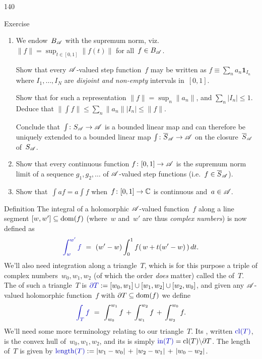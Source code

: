 \begin{parsec}{140}
\begin{point}{20}{Exercise}
\begin{enumerate}
\item
We endow~$B_{\mathscr{A}}$
with the supremum norm,
viz.~$\|f\|=\sup_{t\in[0,1]} \|f(t)\|$
for all~$f\in B_{\mathscr{A}}$.

Show that every $\mathscr{A}$-valued step function~$f$
may be written as
$f\equiv \sum_n a_n \mathbf{1}_{I_n}$
where $I_1,\dotsc,I_N$
are \emph{disjoint and non-empty}
intervals in~$[0,1]$.

Show that 
for such a representation
$\|f\|=\sup_n \|a_n\|$, and
$\sum_n \left|I_n\right|\leq 1$.
Deduce that
$\|\int f\| \leq \sum_n \|a_n\|\left|I_n\right|
\leq \|f\|$.

Conclude that~$\int\colon S_{\mathscr{A}}\to\mathscr{A}$
is a bounded linear map
and can therefore
be uniquely extended to a bounded linear map
$\int\colon \overline{S}_{\mathscr{A}}\to\mathscr{A}$
on the closure~$\overline{S}_{\mathscr{A}}$
of~$S_{\mathscr{A}}$.

\item
Show that every continuous function $f\colon [0,1]\to\mathscr{A}$
is the supremum norm limit
of a sequence $g_1,g_2,\dotsc$
of $\mathscr{A}$-valued step functions
 (i.e.~$f\in\overline{S}_{\mathscr{A}}$).

\item
Show that~$\int af = a\int f$
when~$f\colon [0,1]\to\mathbb{C}$
is continuous and~$a\in \mathscr{A}$.
\end{enumerate}
\end{point}
\begin{point}{30}{Definition}%
The integral of
a holomorphic $\mathscr{A}$-valued function~$f$
along a line segment $[w,w']\subseteq\operatorname{dom}(f)$
	(where~$w$ and~$w'$ are thus \emph{complex numbers})
is now defined as
\begin{equation*}
\Define{\int_{w}^{w'}f}
\ = \ 
(w'-w)\int_0^1f(\,w+t(w'-w)\,)\,dt.
\end{equation*}
%
We'll also need integration along a triangle~$T$,%
which is for this  purpose a triple of 
complex numbers~$w_0,w_1,w_2$
(of which the order \emph{does} matter)
called the
 of~$T$.
The  of
such a triangle~$T$
is $\Define{\partial T}
:=[w_0,w_1]\cup [w_1,w_2]\cup [w_2,w_0]$,
and given any $\mathscr{A}$-valued
holomorphic function~$f$
with $\partial T\subseteq \operatorname{dom}(f)$
we define
\begin{equation*}
	\Define{\int_T f}\ = \ \int_{w_0}^{w_1} f
\,+\, \int_{w_1}^{w_2} f
\,+\, \int_{w_2}^{w_0} f.
\end{equation*}
%
We'll need some more terminology
relating to our triangle~$T$.
Its ,
written $\Define{\mathrm{cl}(T)}$,
is the convex hull of~$w_0,w_1,w_2$,
and its 
is simply
$\Define{\mathrm{in}(T)}=\mathrm{cl}(T)\backslash \partial T$.
The length
of~$T$ is given by
$\Define{\mathrm{length}(T)}:=
\left|w_1-w_0\right|\,+\,
\left|w_2-w_1\right|\,+\,
\left|w_0-w_2\right|$.


\end{point}
\end{parsec}
